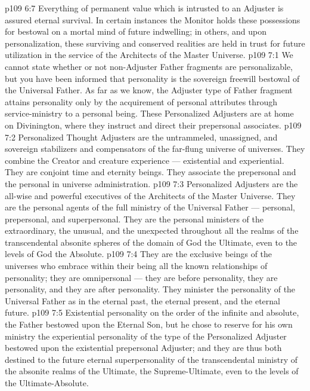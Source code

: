 \vs p109 6:7 Everything of permanent value which is intrusted to an Adjuster is assured eternal survival. In certain instances the Monitor holds these possessions for bestowal on a mortal mind of future indwelling; in others, and upon personalization, these surviving and conserved realities are held in trust for future utilization in the service of the Architects of the Master Universe.
\vs p109 7:1 We cannot state whether or not non\hyp{}Adjuster Father fragments are personalizable, but you have been informed that personality is the sovereign freewill bestowal of the Universal Father. As far as we know, the Adjuster type of Father fragment attains personality only by the acquirement of personal attributes through service\hyp{}ministry to a personal being. These Personalized Adjusters are at home on Divinington, where they instruct and direct their prepersonal associates.
\vs p109 7:2 Personalized Thought Adjusters are the untrammeled, unassigned, and sovereign stabilizers and compensators of the far\hyp{}flung universe of universes. They combine the Creator and creature experience --- existential and experiential. They are conjoint time and eternity beings. They associate the prepersonal and the personal in universe administration.
\vs p109 7:3 Personalized Adjusters are the all\hyp{}wise and powerful executives of the Architects of the Master Universe. They are the personal agents of the full ministry of the Universal Father --- personal, prepersonal, and superpersonal. They are the personal ministers of the extraordinary, the unusual, and the unexpected throughout all the realms of the transcendental absonite spheres of the domain of God the Ultimate, even to the levels of God the Absolute.
\vs p109 7:4 They are the exclusive beings of the universes who embrace within their being all the known relationships of personality; they are omnipersonal --- they are before personality, they are personality, and they are after personality. They minister the personality of the Universal Father as in the eternal past, the eternal present, and the eternal future.
\vs p109 7:5 Existential personality on the order of the infinite and absolute, the Father bestowed upon the Eternal Son, but he chose to reserve for his own ministry the experiential personality of the type of the Personalized Adjuster bestowed upon the existential prepersonal Adjuster; and they are thus both destined to the future eternal superpersonality of the transcendental ministry of the absonite realms of the Ultimate, the Supreme\hyp{}Ultimate, even to the levels of the Ultimate\hyp{}Absolute.
